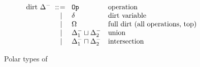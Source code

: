 \begin{figure}[!htb]
\begin{center}
{\begin{minipage}{0.98\columnwidth}
\[\begin{array}{r@{~}c@{~}l@{\quad}l}
    \text{dirt}~\dirt^- & \bnfis {} & \op & \text{operation} \\
    & \bnfor & \delta & \text{dirt variable} \\
    & \bnfor & \allops & \text{full dirt (all operations, top)} \\
    & \bnfor & \dirt_1^- \union \dirt_2^- & \text{union} \\
    & \bnfor & \dirt_1^- \intersection \dirt_2^- & \text{intersection}
\end{array}\]
\end{minipage}
}
\end{center}
\caption{Polar types of \core}\label{fig:types:core:polar}
\end{figure}
    